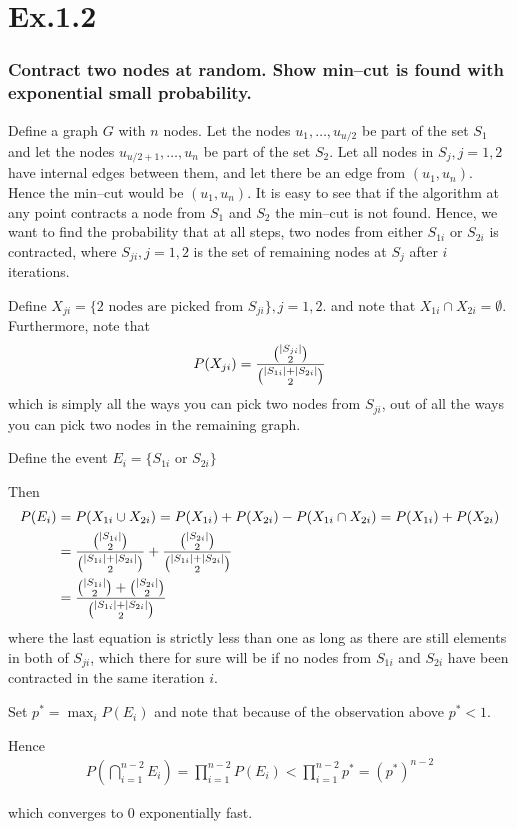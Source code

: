 \section*{Ex.1.2}
\subsubsection*{Contract two nodes at random. Show min--cut is found with exponential small probability.}

Define a graph $G$ with $n$ nodes. Let the nodes $u_1,\ldots,u_{u/2}$ be part of the set $S_1$ and let the nodes $u_{u/2+1},\ldots,u_n$ be part of the set $S_2$. Let all nodes in $S_j, j=1,2$ have internal edges between them, and let there be an edge from $(u_1,u_n)$. Hence the min--cut would be $(u_1,u_n)$. It is easy to see that if the algorithm at any point contracts a node from $S_1$ and $S_2$ the min--cut is not found. Hence, we want to find the probability that at all steps, two nodes from either $S_{1i}$ or $S_{2i}$ is contracted, where $S_{ji}, j=1,2$ is the set of remaining nodes at $S_j$ after $i$ iterations.

Define $X_{ji} = \{ 2 \text{ nodes are picked from } S_{ji} \}, j=1,2$. and note that $X_{1i}\cap X_{2i}= \emptyset$. Furthermore, note that 
$$
P(X_{ji}) = \frac{\binom{\lvert S_{ji}\rvert}{2}}{\binom{\lvert S_{1i}\rvert + \lvert S_{2i}\rvert}{2}}
$$ 
which is simply all the ways you can pick two nodes from $S_{ji}$, out of all the ways you can pick two nodes in the remaining graph.

Define the event $E_i = \{ S_{1i} \text{ or } S_{2i}\}$

Then
\begin{align*}
P(E_i) &= P(X_{1i} \cup X_{2i}) = P(X_{1i}) + P(X_{2i}) - P(X_{1i} \cap X_{2i}) = P(X_{1i}) + P(X_{2i})\\
&=  \frac{\binom{\lvert S_{1i}\rvert}{2}}{\binom{\lvert S_{1i}\rvert + \lvert S_{2i}\rvert}{2}} + \frac{\binom{\lvert S_{2i}\rvert}{2}}{\binom{\lvert S_{1i}\rvert + \lvert S_{2i}\rvert}{2}}\\
&= \frac{\binom{\lvert S_{1i}\rvert}{2} + \binom{\lvert S_{2i}\rvert}{2}}{\binom{\lvert S_{1i}\rvert + \lvert S_{2i}\rvert}{2}}
\end{align*}
where the last equation is strictly less than one as long as there are still elements in both of $S_{ji}$, which there for sure will be if no nodes from $S_{1i}$ and $S_{2i}$ have been contracted in the same iteration $i$.

Set $p^* = \max_{i} P(E_i)$ and note that because of the observation above $p^*<1$.

Hence
\begin{align*}
P(\bigcap_{i=1}^{n-2} E_i) = \prod_{i=1}^{n-2}P(E_i) < \prod_{i=1}^{n-2}p^* = (p^*)^{n-2}
\end{align*}

which converges to 0 exponentially fast.